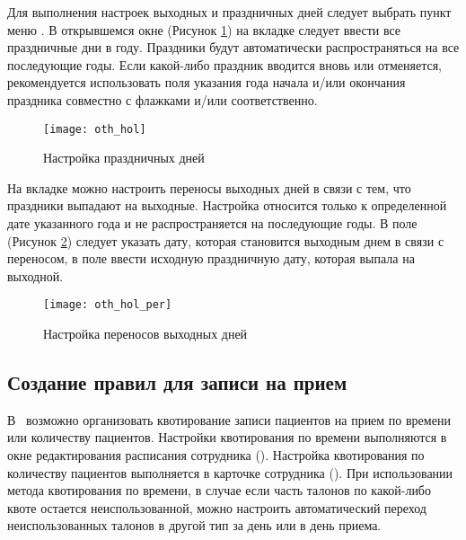 Для выполнения настроек выходных и праздничных дней следует выбрать пункт меню . В открывшемся окне (Рисунок \ref{img_oth_hol}) на вкладке  следует ввести все праздничные дни в году. Праздники будут автоматически распространяться на все последующие годы. Если какой-либо праздник вводится вновь или отменяется, рекомендуется использовать поля указания года начала и\slash или окончания праздника совместно с флажками  и\slash или  соответственно.
 
\begin{figure}[ht]\centering
 \texttt{[image: oth\_hol]}
 \caption{Настройка праздничных дней}
 \label{img_oth_hol}
\end{figure}

На вкладке  можно настроить переносы выходных дней в связи с тем, что праздники выпадают на выходные. Настройка относится только к определенной дате указанного года и не распространяется на последующие годы. В поле  (Рисунок \ref{img_oth_hol_per}) следует указать дату, которая становится выходным днем в связи с переносом, в поле  ввести исходную праздничную дату, которая выпала на выходной.

\begin{figure}[ht]\centering
 \texttt{[image: oth\_hol\_per]}
 \caption{Настройка переносов выходных дней}
 \label{img_oth_hol_per}
\end{figure}

\subsection{Создание правил для записи на прием}

В \tmis~возможно организовать квотирование записи пациентов на прием по времени или количеству пациентов. Настройки квотирования по времени выполняются в окне редактирования расписания сотрудника (). Настройка квотирования по количеству пациентов выполняется в карточке сотрудника (). При использовании метода квотирования по времени, в случае если часть талонов по какой-либо квоте остается неиспользованной, можно настроить автоматический переход неиспользованных талонов в другой тип за день или в день приема.

